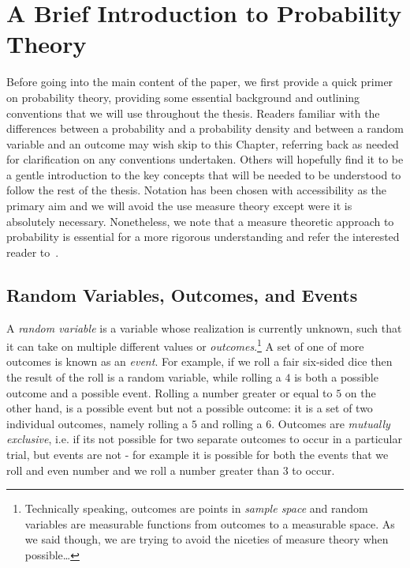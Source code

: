 
\chapter{A Brief Introduction to Probability Theory}
\label{chp:prob}

Before going into the main content of the paper, we first provide a quick primer on probability
theory, providing some essential background and outlining conventions
that we will use throughout the thesis.  Readers familiar with the differences between a probability
and a probability density and between a random variable and an outcome may wish skip to this
Chapter, referring back as needed for clarification on any conventions undertaken.  Others
will hopefully find it to be a gentle introduction to the key concepts that will be needed to
be understood to follow the rest of the thesis.  Notation has been chosen with accessibility 
as the primary aim and we will avoid
the use measure theory except were it is absolutely necessary.  Nonetheless, we note that a measure theoretic
approach to probability is essential for a more rigorous understanding and refer
the interested reader to~\cite{durrett2010probability}.

\section{Random Variables, Outcomes, and Events}
\label{sec:prob:random}

A \emph{random variable} is a variable
whose realization is currently unknown, such that it can take on multiple different
values or \emph{outcomes}.\footnote{Technically speaking, outcomes are points in \emph{sample
		space} and random variables are measurable functions from outcomes to a measurable
	space.  As we said though, we are trying to avoid the niceties of measure theory when
	 possible\dots}
A set of one of more outcomes is known as an \emph{event}.
For example, if we roll a fair six-sided dice then the result of the roll is a random variable, 
while rolling a $4$ is both a possible outcome and a possible event.  Rolling a number greater
or equal to $5$ on the other hand, is a possible event but not a possible outcome: it is a set
of two individual outcomes, namely rolling a $5$ and rolling a $6$.  Outcomes are
\emph{mutually exclusive}, i.e. if its not possible for two separate outcomes to occur in a
particular trial, but events are not - for example it is possible for both the events that we
roll and even number and we roll a number greater than $3$ to occur.

